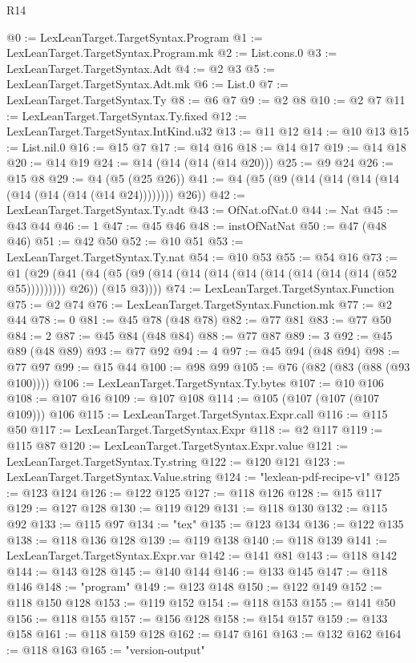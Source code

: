 \begin{lexlean}{R14}
\begin{coremodule}
{{{{{{{{{{{{{{{{{{{{{{{{{{{{{{{{{{{{{{{{{{{{{{{{{{{{{{{{{{{{{{{{{{{{{{{{{{{{{{{{{{@0 := LexLeanTarget.TargetSyntax.Program
@1 := LexLeanTarget.TargetSyntax.Program.mk
@2 := List.cons.{0}
@3 := LexLeanTarget.TargetSyntax.Adt
@4 := @2 @3
@5 := LexLeanTarget.TargetSyntax.Adt.mk
@6 := List.{0}
@7 := LexLeanTarget.TargetSyntax.Ty
@8 := @6 @7
@9 := @2 @8
@10 := @2 @7
@11 := LexLeanTarget.TargetSyntax.Ty.fixed
@12 := LexLeanTarget.TargetSyntax.IntKind.u32
@13 := @11 @12
@14 := @10 @13
@15 := List.nil.{0}
@16 := @15 @7
@17 := @14 @16
@18 := @14 @17
@19 := @14 @18
@20 := @14 @19
@24 := @14 (@14 (@14 (@14 @20)))
@25 := @9 @24
@26 := @15 @8
@29 := @4 (@5 (@25 @26))
@41 := @4 (@5 (@9 (@14 (@14 (@14 (@14 (@14 (@14 (@14 (@14 @24)))))))) @26))
@42 := LexLeanTarget.TargetSyntax.Ty.adt
@43 := OfNat.ofNat.{0}
@44 := Nat
@45 := @43 @44
@46 := 1
@47 := @45 @46
@48 := instOfNatNat
@50 := @47 (@48 @46)
@51 := @42 @50
@52 := @10 @51
@53 := LexLeanTarget.TargetSyntax.Ty.nat
@54 := @10 @53
@55 := @54 @16
@73 := @1
    (@29
      (@41 (@4 (@5 (@9 (@14 (@14 (@14 (@14 (@14 (@14 (@14 (@14 (@52 @55))))))))) @26)) (@15 @3))))
@74 := LexLeanTarget.TargetSyntax.Function
@75 := @2 @74
@76 := LexLeanTarget.TargetSyntax.Function.mk
@77 := @2 @44
@78 := 0
@81 := @45 @78 (@48 @78)
@82 := @77 @81
@83 := @77 @50
@84 := 2
@87 := @45 @84 (@48 @84)
@88 := @77 @87
@89 := 3
@92 := @45 @89 (@48 @89)
@93 := @77 @92
@94 := 4
@97 := @45 @94 (@48 @94)
@98 := @77 @97
@99 := @15 @44
@100 := @98 @99
@105 := @76 (@82 (@83 (@88 (@93 @100))))
@106 := LexLeanTarget.TargetSyntax.Ty.bytes
@107 := @10 @106
@108 := @107 @16
@109 := @107 @108
@114 := @105 (@107 (@107 (@107 @109))) @106
@115 := LexLeanTarget.TargetSyntax.Expr.call
@116 := @115 @50
@117 := LexLeanTarget.TargetSyntax.Expr
@118 := @2 @117
@119 := @115 @87
@120 := LexLeanTarget.TargetSyntax.Expr.value
@121 := LexLeanTarget.TargetSyntax.Ty.string
@122 := @120 @121
@123 := LexLeanTarget.TargetSyntax.Value.string
@124 := "lexlean-pdf-recipe-v1"
@125 := @123 @124
@126 := @122 @125
@127 := @118 @126
@128 := @15 @117
@129 := @127 @128
@130 := @119 @129
@131 := @118 @130
@132 := @115 @92
@133 := @115 @97
@134 := "tex"
@135 := @123 @134
@136 := @122 @135
@138 := @118 @136 @128
@139 := @119 @138
@140 := @118 @139
@141 := LexLeanTarget.TargetSyntax.Expr.var
@142 := @141 @81
@143 := @118 @142
@144 := @143 @128
@145 := @140 @144
@146 := @133 @145
@147 := @118 @146
@148 := "program"
@149 := @123 @148
@150 := @122 @149
@152 := @118 @150 @128
@153 := @119 @152
@154 := @118 @153
@155 := @141 @50
@156 := @118 @155
@157 := @156 @128
@158 := @154 @157
@159 := @133 @158
@161 := @118 @159 @128
@162 := @147 @161
@163 := @132 @162
@164 := @118 @163
@165 := "version-output"
}}}}}}}}}}}}}}}}}}}}}}}}}}}}}}}}}}}}}}}}}}}}}}}}}}}}}}}}}}}}}}}}}}}}}}}}}}}}}}}}}}
\end{coremodule}
\end{lexlean}
